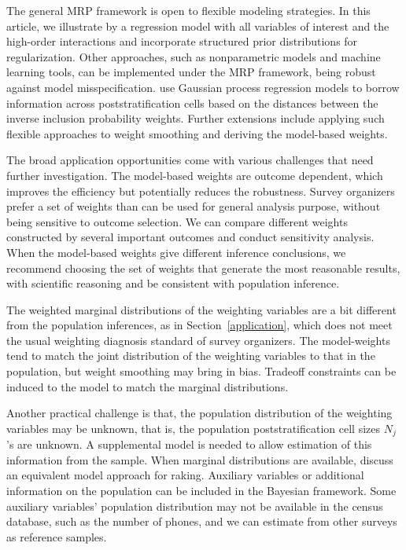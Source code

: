\documentclass[11pt]{article}
\begin{document}
The general MRP framework is open to flexible modeling strategies. In this article, we illustrate by a regression model with all variables of interest and the high-order interactions and incorporate structured prior distributions for regularization. Other approaches, such as nonparametric models and machine learning tools, can be implemented under the MRP framework, being robust against model misspecification. \cite{bnfp:ba15} use Gaussian process regression models to borrow information across poststratification cells based on the distances between the inverse inclusion probability weights. Further extensions include applying such flexible approaches to weight smoothing and deriving the model-based weights. 

The broad application opportunities come with various challenges that need further investigation. The model-based weights are outcome dependent, which improves the efficiency but potentially reduces the robustness. Survey organizers prefer a set of weights than can be used for general analysis purpose, without being sensitive to outcome selection. We can compare different weights constructed by several important outcomes and conduct sensitivity analysis. When the model-based weights give different inference conclusions, we recommend choosing the set of weights that generate the most reasonable results, with scientific reasoning and be consistent with population inference. 

The weighted marginal distributions of the weighting variables are a bit different from the population inferences, as in Section~\ref{application}, which does not meet the usual weighting diagnosis standard of survey organizers. The model-weights tend to match the joint distribution of the weighting variables to that in the population, but weight smoothing may bring in bias. Tradeoff constraints can be induced to the model to match the marginal distributions. 

Another practical challenge is that, the population distribution of the weighting variables may be unknown, that is, the population poststratification cell sizes $N_j$'s are unknown. A supplemental model is needed to allow estimation of this information from the sample. When marginal distributions are available, \cite{rake:little91} discuss an equivalent model approach for raking. Auxiliary variables or additional information on the population can be included in the Bayesian framework. Some auxiliary variables' population distribution may not be available in the census database, such as the number of phones, and we can estimate from other surveys as reference samples.
\end{document}
